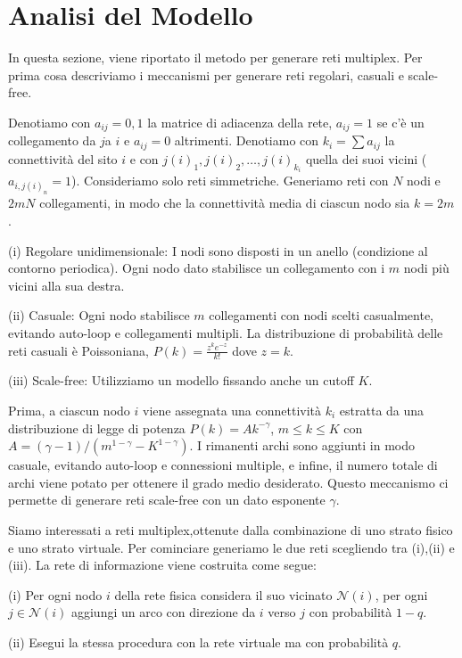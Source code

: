 \section{Analisi del Modello}\label{sec:analisi-del-modello}
In questa sezione, viene riportato il metodo per generare reti multiplex.
Per prima cosa descriviamo i meccanismi per generare reti regolari, casuali e scale-free.

Denotiamo con $a_{ij} = 0,1$ la matrice di adiacenza della rete, $a_{ij} = 1$ se c'è un collegamento da
$j$a $i$ e $a_{ij} = 0$ altrimenti.
Denotiamo con $k_i = \sum a_{ij}$ la connettività del sito $i$ e con $j(i)_1, j(i)_2, \dots, j(i)_{k_i}$
quella dei suoi vicini ($a_{i,j(i)_n} =1$). Consideriamo solo reti simmetriche.
Generiamo reti con $N$ nodi e $2mN$ collegamenti, in modo che la connettività media di ciascun nodo sia $k =2m$.

(i) Regolare unidimensionale: I nodi sono disposti in un anello (condizione al contorno periodica).
Ogni nodo dato stabilisce un collegamento con i $m$ nodi più vicini alla sua destra.

(ii) Casuale: Ogni nodo stabilisce $m$ collegamenti con nodi scelti casualmente, evitando auto-loop e collegamenti
multipli.
La distribuzione di probabilità delle reti casuali è Poissoniana, $P(k) = \frac{z^k e^{-z}}{k!}$ dove $z = k$.

(iii) Scale-free: Utilizziamo un modello fissando anche un cutoff $K$.

Prima, a ciascun nodo $i$ viene assegnata una connettività $k_i$ estratta da una distribuzione di legge di potenza
$P(k) = A k^{-\gamma}$, $m \leq k \leq K$ con $A=(\gamma -1)/(m^{1-\gamma} -K^{1-\gamma})$.
I rimanenti archi sono aggiunti in modo casuale, evitando auto-loop e connessioni multiple, e infine,
il numero totale di archi viene potato per ottenere il grado medio desiderato.
Questo meccanismo ci permette di generare reti scale-free con un dato esponente $\gamma$.

Siamo interessati a reti multiplex,ottenute dalla combinazione di uno strato fisico e uno strato virtuale.
Per cominciare generiamo le due reti scegliendo tra (i),(ii) e (iii). 
La rete di informazione viene costruita come segue:

(i) Per ogni nodo $i$ della rete fisica considera il suo vicinato $\mathcal{N}(i)$, per ogni $j\in \mathcal{N}(i)$
aggiungi un arco con direzione da $i$ verso $j$ con probabilità $1-q$.

(ii) Esegui la stessa procedura con la rete virtuale ma con probabilità $q$.

